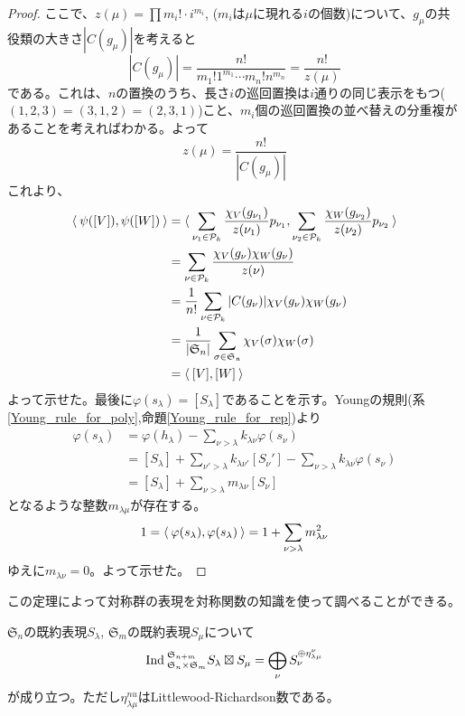 \documentclass{ltjsreport}
\begin{document}
\begin{proof}
  ここで、$z(\mu)=\prod m_i!\cdot i^{m_i}$, ($m_i$は$\mu$に現れる$i$の個数)について、$g_\mu$の共役類の大きさ$|C(g_\mu)|$を考えると
  \[
  |C(g_\mu)|=\frac{n!}{m_1!1^{m_1}\cdots m_n!n^{m_n}}=\frac{n!}{z(\mu)}
  \]
  である。これは、$n$の置換のうち、長さ$i$の巡回置換は$i$通りの同じ表示をもつ($(1,2,3)=(3,1,2)=(2,3,1)$)こと、$m_i$個の巡回置換の並べ替えの分重複があることを考えればわかる。よって
  \[
  z(\mu)=\frac{n!}{|C(g_\mu)|}
  \]
  これより、
  \begin{align*}
    \langle\:\psi([V]),\psi([W])\:\rangle
    &=\langle\:\sum_{\nu_1\in\mathcal{P}_k}\frac{\chi_{V}(g_{\nu_1})}{z(\nu_1)}p_{\nu_1},\sum_{\nu_2\in\mathcal{P}_k}\frac{\chi_{W}(g_{\nu_2})}{z(\nu_2)}p_{\nu_2}\:\rangle\\
    &=\sum_{\nu\in\mathcal{P}_k}\frac{\chi_{V}(g_\nu)\chi_{W}(g_\nu)}{z(\nu)}\\
    &=\frac{1}{n!}\sum_{\nu\in\mathcal{P}_k}
    |C(g_\nu)|\chi_{V}(g_\nu)\chi_{W}(g_\nu)\\
    &=\frac{1}{|\mathfrak{S}_n|}
    \sum_{\sigma\in\mathfrak{S_n}}\chi_{V}(\sigma)\chi_{W}(\sigma)\\
    &=\langle\:[V],[W]\:\rangle
  \end{align*}
  よって示せた。最後に$\varphi(s_\lambda)=[S_\lambda]$であることを示す。Youngの規則(系\ref{Young_rule_for_poly},命題\ref{Young_rule_for_rep})より
  \begin{align*}
  \varphi(s_\lambda)&=\varphi(h_\lambda)-\sum_{\nu>\lambda}k_{\lambda\nu}\varphi(s_\nu)\\
  &=[S_\lambda]+\sum_{\nu'>\lambda}k_{\lambda\nu'}[S_\nu']-\sum_{\nu>\lambda}k_{\lambda\nu}\varphi(s_\nu)\\
  &=[S_\lambda]+\sum_{\nu>\lambda}m_{\lambda\nu}[S_\nu]
  \end{align*}
  となるような整数$m_{\lambda\mu}$が存在する。
  \[
  1=\langle\:\varphi(s_\lambda),\varphi(s_\lambda)\:\rangle=1+\sum_{\nu>\lambda}m_{\lambda\nu}^2
  \]
  ゆえに$m_{\lambda\nu}=0$。よって示せた。
\end{proof}



この定理によって対称群の表現を対称関数の知識を使って調べることができる。

\begin{cor}\label{LR_for_rep}
  $\mathfrak{S}_n$の既約表現$S_\lambda$, $\mathfrak{S}_m$の既約表現$S_\mu$について
  \[
  \text{Ind}\:_{\mathfrak{S}_n\times\mathfrak{S}_m}^{\mathfrak{S}_{n+m}}S_\lambda\boxtimes S_\mu =\bigoplus_{\nu}S_\nu^{\oplus\eta^{\nu}_{\lambda\mu}} 
  \]
  が成り立つ。ただし$\eta^{nu}_{\lambda\mu}$はLittlewood-Richardson数である。
\end{cor}
\end{document}
